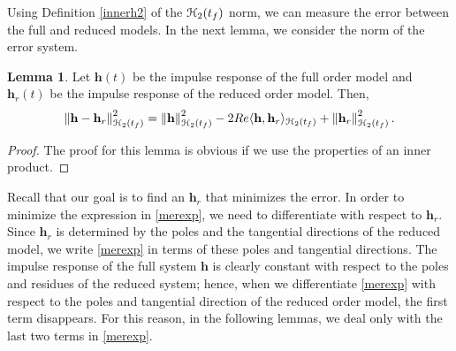 \documentclass[preprint]{elsarticle}
\theoremstyle{definition}
\theoremstyle{definition}
\def\mathcal{\EuScript}
\numberwithin{equation}{section}
\newtheorem{Lemma}[Theorem]{Lemma}
\newcommand{\h}{\mathbf{h}}
\newcommand{\tf}{t_f}
\newcommand{\ch}{\mathcal{H}}
\newcommand{\norm}[1]{\left\lVert#1\right\rVert}
\begin{document}
Using Definition \ref{innerh2} of the $\ch_2(\tf)$ norm, we can measure the error between the full and reduced models. In the next lemma, we consider the norm of the error system. 
\begin{Lemma}\label{merrsq}
Let $\h(t)$ be the impulse response of the full order model and $\h_r(t)$ be the impulse response of the reduced order model. Then, 
\begin{equation}\label{merexp}
\begin{aligned}
\norm{\h-\h_r}_{\ch_2({\tf})}^2=\norm{\h}_{\ch_2({\tf})}^2-2Re\langle\h, \h_r\rangle_{\ch_2({\tf})}+\norm{\h_r}_{\ch_2({\tf})}^2.
\end{aligned}
\end{equation}
\end{Lemma}
\begin{proof}
The proof for this lemma is obvious if we use the properties of an inner product.
\end{proof}
Recall that our goal is to find an $\h_r$ that minimizes the error. In order to minimize the expression in \eqref{merexp}, we need to differentiate with respect to $\h_r$. Since $\h_r$ is determined by the poles and the tangential directions of the reduced model, we write \eqref{merexp} in terms of these poles and tangential directions. The impulse response of the full system $\h$ is clearly constant with respect to the poles and residues of the reduced system; hence, when we differentiate \eqref{merexp} with respect to the poles and tangential direction of the reduced order model, the first term disappears. For this reason, in the following lemmas, we deal only with the last two terms in \eqref{merexp}.   
\end{document}
